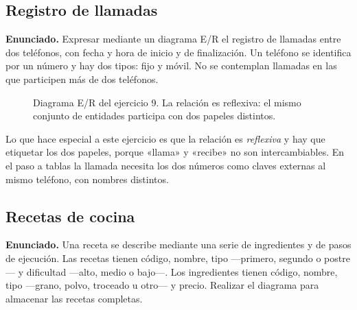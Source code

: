 \subsection{Registro de llamadas}

\textbf{Enunciado.} Expresar mediante un diagrama E/R el registro de llamadas
entre dos teléfonos, con fecha y hora de inicio y de finalización. Un teléfono
se identifica por un número y hay dos tipos: fijo y móvil. No se contemplan
llamadas en las que participen más de dos teléfonos.

\begin{figure}[H]
\centering
{}
\caption{Diagrama E/R del ejercicio 9. La relación es reflexiva: el mismo
conjunto de entidades participa con dos papeles distintos.}
\end{figure}

Lo que hace especial a este ejercicio es que la relación es \emph{reflexiva} y
hay que etiquetar los dos papeles, porque «llama» y «recibe» no son
intercambiables. En el paso a tablas la llamada necesita los dos números como
claves externas al mismo teléfono, con nombres distintos.

\subsection{Recetas de cocina}

\textbf{Enunciado.} Una receta se describe mediante una serie de ingredientes y
de pasos de ejecución. Las recetas tienen código, nombre, tipo —primero,
segundo o postre— y dificultad —alto, medio o bajo—. Los ingredientes tienen
código, nombre, tipo —grano, polvo, troceado u otro— y precio. Realizar el
diagrama para almacenar las recetas completas.

